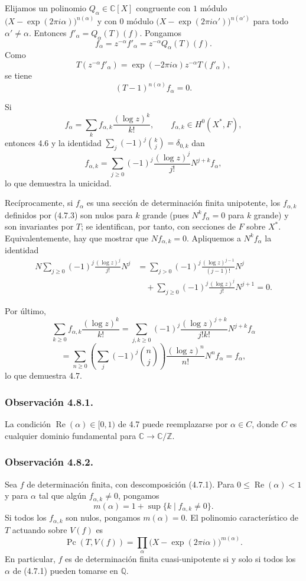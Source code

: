 Elijamos un polinomio $Q_\alpha\in\mathbb C[X]$ congruente con $1$
módulo $\bigl(X-\exp(2\pi i\alpha)\bigr)^{n(\alpha)}$ y con $0$
módulo $\bigl(X-\exp(2\pi i\alpha')\bigr)^{n(\alpha')}$ para todo
$\alpha'\ne\alpha$. Entonces $f'_\alpha=Q_\alpha(T)(f)$. Pongamos
\begin{equation}\tag{4.7.2}
f_\alpha=z^{-\alpha}f'_\alpha
=z^{-\alpha}Q_\alpha(T)(f).
\end{equation}
Como
\[
T(z^{-\alpha}f'_\alpha)
=\exp(-2\pi i\alpha)z^{-\alpha}T(f'_\alpha),
\]
se tiene
\[
(T-1)^{n(\alpha)}f_\alpha=0.
\]

Si
\[
f_\alpha=\sum_k f_{\alpha,k}\frac{(\log z)^k}{k!},
\qquad f_{\alpha,k}\in H^0(X^*,F),
\]
entonces 4.6 y la identidad
$\sum_j(-1)^j\binom{k}{j}=\delta_{0,k}$ dan
\begin{equation}\tag{4.7.3}
f_{\alpha,k}
=\sum_{j\geq0}(-1)^j\frac{(\log z)^j}{j!}
  N^{j+k}f_\alpha,
\end{equation}
lo que demuestra la unicidad.

Recíprocamente, si $f_\alpha$ es una sección de determinación finita
unipotente, los $f_{\alpha,k}$ definidos por (4.7.3) son nulos para
$k$ grande (pues $N^k f_\alpha=0$ para $k$ grande) y son invariantes por
$T$; se identifican, por tanto, con secciones de $F$ sobre $X^*$.
Equivalentemente, hay que mostrar que $Nf_{\alpha,k}=0$. Apliquemos a
$N^k f_\alpha$ la identidad
\[
\begin{aligned}
N\sum_{j\geq0}(-1)^j\frac{(\log z)^j}{j!}N^j
&=\sum_{j>0}(-1)^j\frac{(\log z)^{j-1}}{(j-1)!}N^j\\
&\quad+\sum_{j\geq0}(-1)^j\frac{(\log z)^j}{j!}N^{j+1}=0.
\end{aligned}
\]

\pageoriginale

Por último,
\[
\sum_{k\geq0}f_{\alpha,k}\frac{(\log z)^k}{k!}
=\sum_{j,k\geq0}(-1)^j
 \frac{(\log z)^{j+k}}{j!k!}N^{j+k}f_\alpha
\]
\[
=\sum_{n\geq0}
 \left(\sum_j(-1)^j\binom nj\right)
 \frac{(\log z)^n}{n!}N^n f_\alpha
=f_\alpha,
\]
lo que demuestra 4.7.

\subsubsection*{Observación 4.8.1.}
La condición $\operatorname{Re}(\alpha)\in[0,1)$ de 4.7 puede
reemplazarse por $\alpha\in C$, donde $C$ es cualquier dominio
fundamental para $\mathbb C\longrightarrow\mathbb C/\mathbb Z$.

\subsubsection*{Observación 4.8.2.}
Sea $f$ de determinación finita, con descomposición (4.7.1). Para
$0\leq\operatorname{Re}(\alpha)<1$ y para $\alpha$ tal que algún
$f_{\alpha,k}\ne0$, pongamos
\[
m(\alpha)=1+\sup\{k\mid f_{\alpha,k}\ne0\}.
\]
Si todos los $f_{\alpha,k}$ son nulos, pongamos $m(\alpha)=0$. El
polinomio característico de $T$ actuando sobre $V(f)$ es
\[
\operatorname{Pc}(T,V(f))
=\prod_\alpha\bigl(X-\exp(2\pi i\alpha)\bigr)^{m(\alpha)}.
\]
En particular, $f$ es de determinación finita cuasi-unipotente si y
solo si todos los $\alpha$ de (4.7.1) pueden tomarse en $\mathbb Q$.


